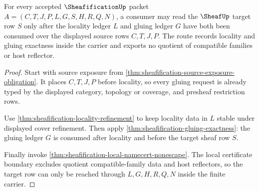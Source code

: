 \begin{theorem}
\label{thm:sheafification-local-gluing-obligation}
For every accepted $\SheafificationUp$ packet $A=(C,T,J,P,L,G,S,H,R,Q,N)$, a consumer may read the $\SheafUp$ target row $S$ only after the locality ledger $L$ and gluing ledger $G$ have both been consumed over the displayed source rows $C,T,J,P$. The route records locality and gluing exactness inside the carrier and exports no quotient of compatible families or host reflector.
\end{theorem}
\begin{proof}
Start with source exposure from \autoref{thm:sheafification-source-exposure-obligation}. It places $C,T,J,P$ before locality, so every gluing request is already typed by the displayed category, topology or coverage, and presheaf restriction rows.

Use \autoref{thm:sheafification-locality-refinement} to keep locality data in $L$ stable under displayed cover refinement. Then apply \autoref{thm:sheafification-gluing-exactness}: the gluing ledger $G$ is consumed after locality and before the target sheaf row $S$.

Finally invoke \autoref{thm:sheafification-local-namecert-nonescape}. The local certificate boundary excludes quotient compatible-family data and host reflectors, so the target row can only be reached through $L,G,H,R,Q,N$ inside the finite carrier.
\end{proof}

